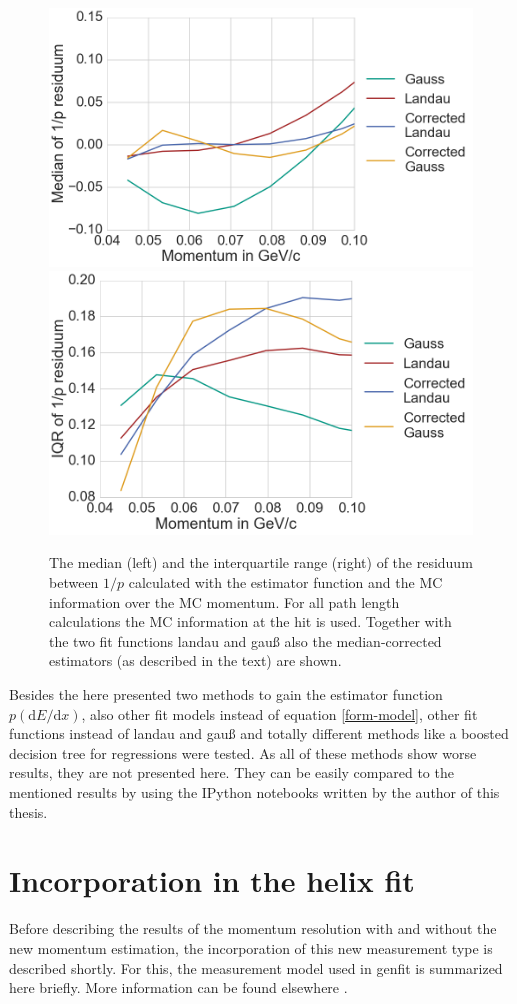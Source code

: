 \begin{figure}
  \centering
   \includegraphics[width=0.47\linewidth]{figures/vxd/divPMedian.png}
   \includegraphics[width=0.47\linewidth]{figures/vxd/divPIQR.png}
  \caption[Median and IQR of $1/p$.]{The median (left) and the interquartile range (right) of the residuum between $1/p$ calculated with the estimator function and the MC information over the MC momentum. For all path length calculations the MC information at the hit is used. Together with the two fit functions landau and gauß also the median-corrected estimators (as described in the text) are shown.}
  \label{fig-divp-residuum}
\end{figure}


Besides the here presented two methods to gain the estimator function $p(\mathrm dE/\mathrm dx)$, also other fit models instead of equation \ref{form-model}, other fit functions instead of landau and gauß and totally different methods like a boosted decision tree for regressions were tested. As all of these methods show worse results, they are not presented here. They can be easily compared to the mentioned results by using the IPython notebooks written by the author of this thesis.

\section{Incorporation in the helix fit}

Before describing the results of the momentum resolution with and without the new momentum estimation, the incorporation of this new measurement type is described shortly. For this, the measurement model used in genfit is summarized here briefly. More information can be found elsewhere \cite{genfit}.

